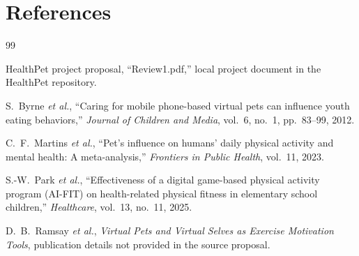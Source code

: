 \documentclass[conference]{IEEEtran}
\begin{document}
\section*{References}
\begin{thebibliography}{99}

HealthPet project proposal, ``Review1.pdf,'' local project document in the HealthPet repository.

S.~Byrne \textit{et al.}, ``Caring for mobile phone-based virtual pets can influence youth eating behaviors,'' \textit{Journal of Children and Media}, vol.~6, no.~1, pp.~83--99, 2012.

C.~F.~Martins \textit{et al.}, ``Pet's influence on humans' daily physical activity and mental health: A meta-analysis,'' \textit{Frontiers in Public Health}, vol.~11, 2023.

S.-W.~Park \textit{et al.}, ``Effectiveness of a digital game-based physical activity program (AI-FIT) on health-related physical fitness in elementary school children,'' \textit{Healthcare}, vol.~13, no.~11, 2025.

D.~B.~Ramsay \textit{et al.}, \textit{Virtual Pets and Virtual Selves as Exercise Motivation Tools}, publication details not provided in the source proposal.

\end{thebibliography}
\end{document}
